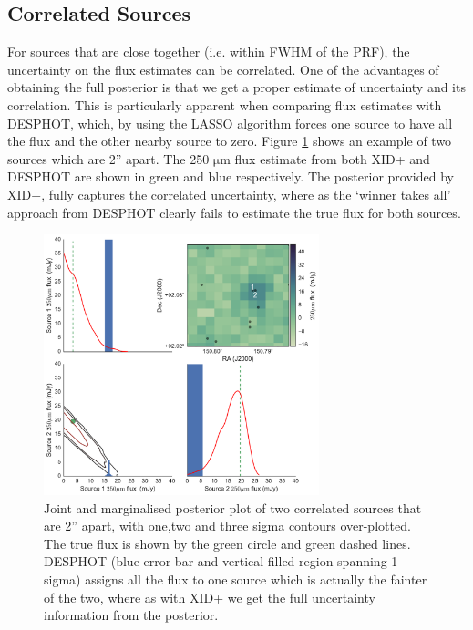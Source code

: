 \documentclass[useAMS,usenatbib]{mnras}
\begin{document}
\subsection{Correlated Sources}
For sources that are close together (i.e. within FWHM of the PRF), the uncertainty on the flux estimates can be correlated. One of the advantages of obtaining the full posterior is that we get a proper estimate of uncertainty and its correlation. This is particularly apparent when comparing flux estimates with \textsc{DESPHOT}, which, by using the LASSO algorithm forces one source to have all the flux and the other nearby source to zero. Figure \ref{fig:corr} shows an example of two sources which are 2'' apart. The 250 $\mathrm{\mu m}$ flux estimate from both \textsc{XID+} and \textsc{DESPHOT} are shown in green and blue respectively. The posterior provided by XID+, fully captures the correlated uncertainty, where as the `winner takes all' approach from \textsc{DESPHOT} clearly fails to estimate the true flux for both sources.
 
\begin{figure} 
\includegraphics[width=8cm]{XID+_vs_DESPHOT_joint.pdf}
\caption{Joint and marginalised posterior plot of two correlated sources that are 2'' apart, with one,two and three sigma contours over-plotted. The true flux is shown by the green circle and green dashed lines. \textsc{DESPHOT} (blue error bar and vertical filled region spanning 1 sigma) assigns all the flux to one source which is actually the fainter of the two, where as with \textsc{XID+} we get the full uncertainty information from the posterior.}\label{fig:corr}
\end{figure}
\end{document}
